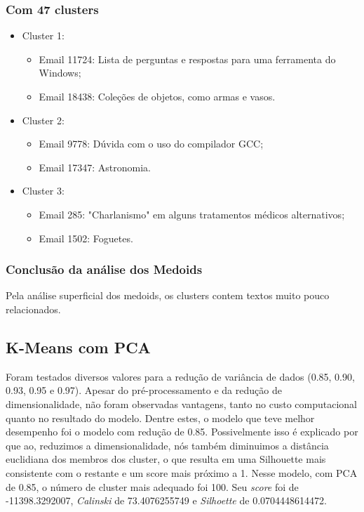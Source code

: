 \documentclass[conference]{IEEEtran}
\begin{document}
\subsubsection{Com 47 clusters}

\begin{itemize}

\item Cluster 1:
\begin{itemize}
\item Email 11724: Lista de perguntas e respostas para uma ferramenta do Windows;
\item Email 18438: Coleções de objetos, como armas e vasos.
\end{itemize}

\item Cluster 2:
\begin{itemize}
\item Email 9778: Dúvida com o uso do compilador GCC;
\item Email 17347: Astronomia.
\end{itemize}

\item Cluster 3:
\begin{itemize}
\item Email 285: "Charlanismo" em alguns tratamentos médicos alternativos;
\item Email 1502: Foguetes.
\end{itemize}

\end{itemize}

\subsubsection{Conclusão da análise dos Medoids}
Pela análise superficial dos medoids, os clusters contem textos muito pouco relacionados.

\subsection{K-Means com PCA}
Foram testados diversos valores para a redução de variância de dados (0.85, 0.90, 0.93, 0.95 e 0.97). Apesar do pré-processamento e da redução de dimensionalidade, não foram observadas vantagens, tanto no custo computacional quanto no resultado do modelo. Dentre estes, o modelo que teve melhor desempenho foi o modelo com redução de 0.85. Possivelmente isso é explicado por que ao, reduzimos a dimensionalidade, nós também diminuimos a distância euclidiana dos membros dos cluster, o que resulta em uma Silhouette mais consistente com o restante e um score mais próximo a 1. Nesse modelo, com PCA de 0.85, o número de cluster mais adequado foi 100. Seu \textit{score} foi de -11398.3292007, \textit{Calinski} de 73.4076255749 e \textit{Silhoette} de 0.0704448614472.
 
\end{document}
